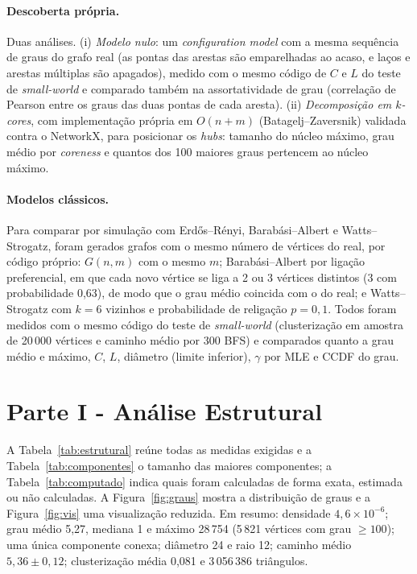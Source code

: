 \documentclass[sigconf]{webmedia}
\begin{document}
\paragraph{Descoberta própria.} Duas análises. (i) \emph{Modelo nulo}: um \emph{configuration model} com a mesma sequência de graus do grafo real (as pontas das arestas são emparelhadas ao acaso, e laços e arestas múltiplas são apagados), medido com o mesmo código de $C$ e $L$ do teste de \emph{small-world} e comparado também na assortatividade de grau (correlação de Pearson entre os graus das duas pontas de cada aresta). (ii) \emph{Decomposição em $k$-cores}, com implementação própria em $O(n+m)$ (Batagelj--Zaversnik) validada contra o NetworkX, para posicionar os \emph{hubs}: tamanho do núcleo máximo, grau médio por \emph{coreness} e quantos dos 100 maiores graus pertencem ao núcleo máximo.

\paragraph{Modelos clássicos.} Para comparar por simulação com Erdős--Rényi, Barabási--Albert e Watts--Strogatz, foram gerados grafos com o mesmo número de vértices do real, por código próprio: $G(n,m)$ com o mesmo $m$; Barabási--Albert \cite{barabasi1999} por ligação preferencial, em que cada novo vértice se liga a 2 ou 3 vértices distintos (3 com probabilidade 0,63), de modo que o grau médio coincida com o do real; e Watts--Strogatz \cite{watts1998} com $k=6$ vizinhos e probabilidade de religação $p=0{,}1$. Todos foram medidos com o mesmo código do teste de \emph{small-world} (clusterização em amostra de 20\,000 vértices e caminho médio por 300 BFS) e comparados quanto a grau médio e máximo, $C$, $L$, diâmetro (limite inferior), $\gamma$ por MLE e CCDF do grau.

\section{Parte I - Análise Estrutural}
\label{sec:parte1}
A Tabela~\ref{tab:estrutural} reúne todas as medidas exigidas e a Tabela~\ref{tab:componentes} o tamanho das maiores componentes; a Tabela~\ref{tab:computado} indica quais foram calculadas de forma exata, estimada ou não calculadas. A Figura~\ref{fig:graus} mostra a distribuição de graus e a Figura~\ref{fig:vis} uma visualização reduzida. Em resumo: densidade $4{,}6\times10^{-6}$; grau médio 5,27, mediana 1 e máximo 28\,754 (5\,821 vértices com grau $\geq100$); uma única componente conexa; diâmetro 24 e raio 12; caminho médio $5{,}36\pm0{,}12$; clusterização média 0,081 e 3\,056\,386 triângulos.
\end{document}
